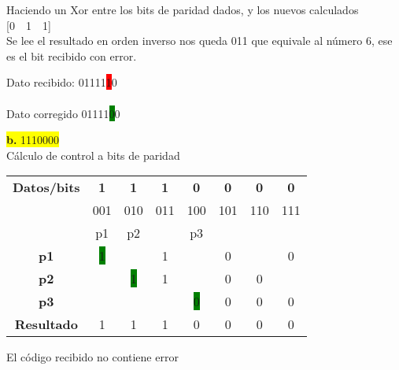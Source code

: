 \documentclass{article}
\begin{document}
		\begin{center}
		Haciendo un Xor entre los bits de paridad dados, y los nuevos calculados
		\vspace{0.1cm}
		[0~~1~~1]\\
		
		\vspace{0.5cm}
		Se lee el resultado en orden inverso nos queda 011 que equivale al número 6, ese es el bit recibido con error.
		\end{center}
	\vspace{0.3cm}
	Dato recibido: 01111\colorbox{red}{1}0\\\\
	Dato corregido 01111\colorbox{green}{0}0\\
	
	
	\begin{center}
		\hspace{3cm}\colorbox{yellow}{{\textbf{b.} 1110000}}\newline
		\\Cálculo de control a bits de paridad
		
		\begin{table}[h!]
			\centering
			\begin{tabular}{c|ccccccc}
				\toprule
				\textbf{Datos/bits} & \textbf{1} & \textbf{1} & \textbf{1} & \textbf{0} & \textbf{0} & \textbf{0} & \textbf{0}\\ & \scriptsize001 & \scriptsize010 & \scriptsize011 & \scriptsize100 & \scriptsize101 & \scriptsize110 & \scriptsize111\\
				\midrule
				\textbf{} & p1 & p2 & & p3 & & & \\
				\midrule
				\textbf{p1} & \colorbox{green}{1} & & 1 & & 0 & & 0\\
				\midrule
				\textbf{p2} &  & \colorbox{green}{1} & 1 & & 0 & 0  \\
				\midrule
				\textbf{p3} & & & & \colorbox{green}{0} & 0 & 0 & 0 \\
				\midrule
				\textbf{Resultado} & 1 & 1 & 1 & 0 & 0 & 0 & 0\\
				\bottomrule
			\end{tabular}
		\end{table}
	\end{center}
	
	\begin{center}
		El código recibido no contiene error 
	\end{center}
\end{document}
